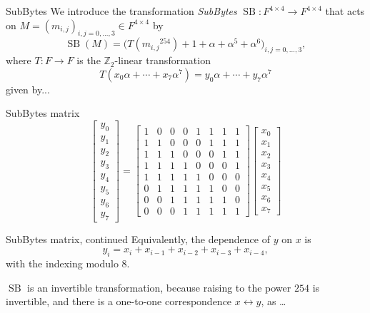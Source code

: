 \documentclass{beamer}
\newcommand{\Z}{\mathbb{Z}}
\begin{document}
\newcommand{\SB}{\operatorname{SB}}
\begin{frame}{SubBytes} 
	We introduce the transformation \emph{SubBytes}
	$\SB : F^{4 \times 4} \to F^{4 \times 4}$ that acts on $ M = (m_{i,j})_{i,j=0,\ldots,3} \in F^{4 \times 4}$ by 
	\[
		\SB(M) = \biggl( T( {m_{i,j}}^{254}) + 1 + \alpha + \alpha^5 + \alpha^6 \biggr)_{i,j=0,\ldots,3},
	\]
	where $T : F \to F$ is the $\Z_2$-linear transformation 
	\[
		T( x_0 \alpha +\cdots + x_7 \alpha^7) = y_0 \alpha + \cdots + y_7 \alpha^7
	\] 
	given by...
\end{frame} 

\begin{frame}{SubBytes matrix} 
		\[
	\begin{bmatrix} y_0 \\ y_1 \\ y_2 \\ y_3 \\ y_4 \\ y_5 \\ y_6 \\ y_7 \end{bmatrix} = \begin{bmatrix} 1 & 0 & 0 & 0 & 1 & 1 & 1 & 1 
	\\ 1 & 1 & 0 & 0 & 0 & 1 & 1 & 1 
\\ 1 & 1 & 1 & 0 & 0 & 0 & 1 & 1 
\\ 1 & 1 & 1 & 1 & 0 & 0 & 0 & 1 
\\ 1 & 1 & 1 & 1 & 1 & 0 & 0 & 0 
\\ 0 & 1 & 1 & 1 & 1 & 1 & 0 & 0 
\\ 0 & 0 & 1 & 1 & 1 & 1 & 1 & 0 
\\ 0 & 0 & 0 & 1 & 1  & 1 & 1 & 1 \end{bmatrix} \begin{bmatrix} x_0 \\ x_1 \\ x_2 \\ x_3 \\ x_4 \\ x_5 \\ x_6 \\ x_7 \end{bmatrix} 
	\]
\end{frame} 

\begin{frame}{SubBytes matrix, continued} 
	Equivalently, the dependence of $y$ on $x$ is 
	\[
		y _i = x_i + x_{i-1} + x_{i-2} + x_{i-3} + x_{i-4},
	\] 
	with the indexing modulo $8$. 
	
	$\SB$ is an invertible transformation, because raising to the power $254$ is invertible, and there is a one-to-one correspondence $x \leftrightarrow y$, as \ldots
\end{frame} 
\end{document}
